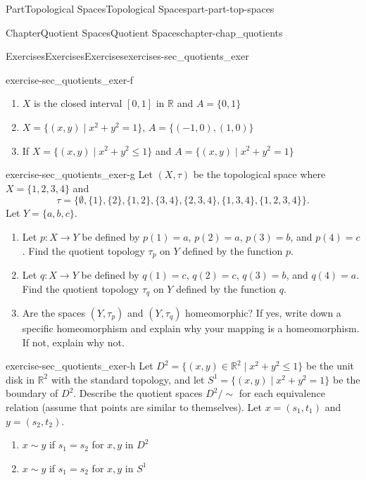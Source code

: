 \documentclass[oneside,10pt,]{book}
\numberwithin{equation}{chapter}
\newcommand{\R}{\mathbb{R}}
\newcommand{\ssim}{\sim}
\begin{document}
\begin{partptx}{Part}{Topological Spaces}{}{Topological Spaces}{}{}{part-part-top-spaces}
\begin{chapterptx}{Chapter}{Quotient Spaces}{}{Quotient Spaces}{}{}{chapter-chap_quotients}
\begin{exercises-section}{Exercises}{Exercises}{}{Exercises}{}{}{exercises-sec_quotients_exer}
\begin{divisionexercise}{5}{}{}{exercise-sec_quotients_exer-f}
\begin{enumerate}[font=\bfseries,label=(\alph*),ref=\alph*]%
\item{}\(X\) is the closed interval \([0,1]\) in \(\R\) and \(A = \{0,1\}\)%
\item{}\(X = \{(x,y) \mid x^2+y^2 = 1\}\), \(A = \{(-1,0), (1,0)\}\)%
\item{}If \(X= \{(x,y) \mid x^2+y^2 \leq 1\}\) and \(A = \{(x,y) \mid x^2+y^2 = 1\}\)%
\end{enumerate}%
\end{divisionexercise}%
\begin{divisionexercise}{6}{}{}{exercise-sec_quotients_exer-g}%
Let \((X, \tau)\) be the topological space where \(X = \{1, 2, 3, 4\}\) and%
\begin{equation*}
\tau = \{\emptyset, \{1\}, \{2\}, \{1, 2\}, \{3, 4\}, \{2, 3, 4\}, \{1, 3, 4\}, \{1, 2, 3, 4\}\}\text{.}
\end{equation*}
Let \(Y = \{a, b, c\}\).%
\begin{enumerate}[font=\bfseries,label=(\alph*),ref=\alph*]%
\item{}Let \(p: X \to Y\) be defined by \(p(1)=a\), \(p(2) = a\), \(p(3)=b\), and \(p(4) = c\). Find the quotient topology \(\tau_p\) on \(Y\) defined by the function \(p\).%
\item{}Let \(q : X \to Y\) be defined by \(q(1)=c\), \(q(2) = c\), \(q(3) = b\), and \(q(4) = a\). Find the quotient topology \(\tau_q\) on \(Y\) defined by the function \(q\).%
\item{}Are the spaces \((Y, \tau_p)\) and \((Y, \tau_q)\) homeomorphic? If yes, write down a specific homeomorphism and explain why your mapping is a homeomorphism. If not, explain why not.%
\end{enumerate}%
\end{divisionexercise}%
\begin{divisionexercise}{7}{}{}{exercise-sec_quotients_exer-h}%
Let \(D^2 = \{(x,y) \in \R^2 \mid x^2+y^2 \leq 1\}\) be the unit disk in \(\R^2\) with the standard topology, and let \(S^1 = \{(x,y) \mid x^2+y^2 = 1\}\) be the boundary of \(D^2\). Describe the quotient spaces \(D^2/\ssim\) for each equivalence relation (assume that points are similar to themselves). Let \(x = (s_1,t_1)\) and \(y = (s_2,t_2)\).%
\begin{enumerate}[font=\bfseries,label=(\alph*),ref=\alph*]%
\item{}\(x \sim y\) if \(s_1=s_2\) for \(x, y\) in \(D^2\)%
\item{}\(x \sim y\) if \(s_1=s_2\) for \(x, y\) in \(S^1\)%

\end{enumerate}
\end{divisionexercise}
\end{exercises-section}
\end{chapterptx}
\end{partptx}
\end{document}
